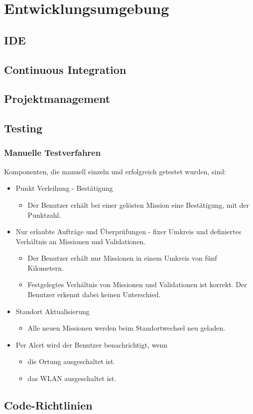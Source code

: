 \chapter{Entwicklungsumgebung}
\label{pd-entwicklungsumgebung}


\section{IDE}


\section{Continuous Integration}


\section{Projektmanagement}


\section{Testing}


\subsection{Manuelle Testverfahren}
Komponenten, die manuell einzeln und erfolgreich getestet wurden, sind:

\begin{itemize}
	\item Punkt Verleihung - Bestätigung
	\begin{itemize}
		\item Der Benutzer erhält bei einer gelösten Mission eine Bestätigung, mit der Punktzahl.
	\end{itemize}
	\item Nur erlaubte Aufträge und Überprüfungen - fixer Umkreis und definiertes Verhältnis an Missionen und Validationen.
	\begin{itemize}
		\item Der Benutzer erhält nur Missionen in einem Umkreis von fünf Kilometern.
		\item Festgelegtes Verhältnis von Missionen und Validationen ist korrekt. 
		Der Benutzer erkennt dabei keinen Unterschied.
	\end{itemize}
	\item Standort Aktualisierung
	\begin{itemize}
		\item Alle neuen Missionen werden beim Standortwechsel neu geladen.
	\end{itemize}
	\item Per Alert wird der Benutzer benachrichtigt, wenn
	\begin{itemize}
		\item die Ortung ausgeschaltet ist.
		\item das WLAN ausgeschaltet ist.
	\end{itemize}
\end{itemize}


\section{Code-Richtlinien}